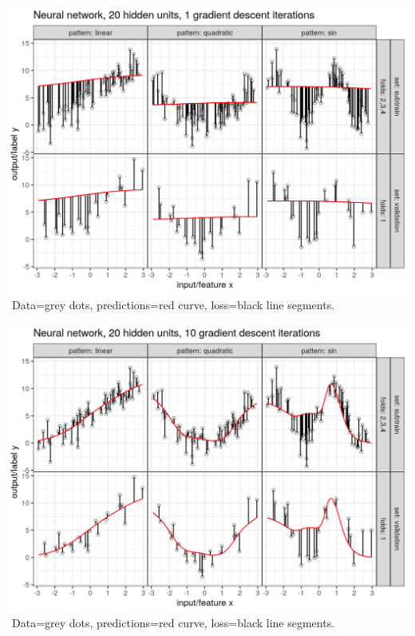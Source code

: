 
\begin{frame}
  \includegraphics[width=\textwidth]{figure-overfitting-pred-units=20-maxit=1.png}
\ Data=grey dots, predictions=red curve, loss=black line segments.

\end{frame}


\begin{frame}
  \includegraphics[width=\textwidth]{figure-overfitting-pred-units=20-maxit=10.png}
\ Data=grey dots, predictions=red curve, loss=black line segments.

\end{frame}


